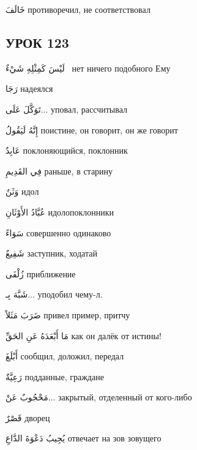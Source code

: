 \documentclass[a5paper]{article}
\newcommand\textstyleDropCaps[1]{#1}
\newcommand\textstyleCaptioncharacters[1]{#1}
\begin{document}
\textstyleCaptioncharacters{خَالَفَ }\textstyleDropCaps{противоречил, не соответствовал‎}

\subsection[УРОК 123‎]{\textstyleDropCaps{УРОК 123‎}}
\textstyleCaptioncharacters{لَيْسَ كَمِثْلِهِ شَيْءٌ \ }\textstyleDropCaps{нет ничего подобного Ему ‎}

\textstyleCaptioncharacters{رَجَا }\textstyleDropCaps{надеялся‎}

\textstyleCaptioncharacters{تَوَكَّلَ عَلَى... }\textstyleDropCaps{уповал, рассчитывал‎}

\textstyleCaptioncharacters{إِنَّهُ لَيَقُولُ }\textstyleDropCaps{поистине, он говорит, он же говорит‎}

\textstyleCaptioncharacters{عَابِدٌ }\textstyleDropCaps{поклоняющийся, поклонник‎}

\textstyleCaptioncharacters{فِي القَدِيمِ }\textstyleDropCaps{раньше, в ста­рину‎}

\textstyleCaptioncharacters{وَثَنٌ }\textstyleDropCaps{идол‎}

\textstyleCaptioncharacters{عُبَّادُ الأَوْثَانِ }\textstyleDropCaps{идоло­поклонники‎}

\textstyleCaptioncharacters{سَوَاءً }\textstyleDropCaps{совершенно одина­ково‎}

\textstyleCaptioncharacters{شَفِيعٌ }\textstyleDropCaps{заступник, ходатай‎}

\textstyleCaptioncharacters{زُلْفَى }\textstyleDropCaps{приближение‎}

\textstyleCaptioncharacters{شَبَّهَ بِـ... }\textstyleDropCaps{уподобил чему-л.‎}

\textstyleCaptioncharacters{ضَرَبَ مَثَلاً }\textstyleDropCaps{привел при­мер, притчу‎}

\textstyleCaptioncharacters{مَا أَبْعَدَهُ عَنِ الحَقِّ }\textstyleDropCaps{как он далёк от истины!‎}

\textstyleCaptioncharacters{أَبْلَغَ }\textstyleDropCaps{сообщил, доложил, передал‎}

\textstyleCaptioncharacters{رَعِيَّةٌ }\textstyleDropCaps{подданные, гражда­не‎}

\textstyleCaptioncharacters{مَحْجُوبٌ عَنْ... }\textstyleDropCaps{закры­тый, отделенный от кого-либо‎}

\textstyleCaptioncharacters{قَصْرٌ }\textstyleDropCaps{дворец‎}

\textstyleCaptioncharacters{يُجِيبُ دَعْوَةَ الدَّاعِ }\textstyleDropCaps{от­вечает на зов зовущего ‎}
\end{document}
